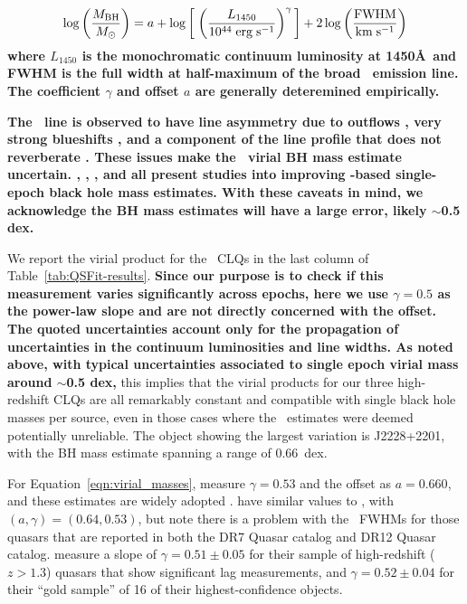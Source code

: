 \documentclass[fleqn,usenatbib]{mnras}
\begin{document}
{\bf
\begin{equation}
  \log \left( \frac{M_{\rm BH}}{M_{\odot}} \right)  = a + \log  \left[ \; \left(  \frac{L_{1450}} {10^{44} \; {\rm erg \; s^{-1}}}\right)^{\gamma} \, \right] + 2 \log \left( \frac{\rm {FWHM}}{{\rm km\; s^{-1}}} \right)
  \label{eqn:virial_masses}
\end{equation}
where $L_{1450}$ is the monochromatic continuum luminosity at
1450\AA\, and FWHM is the full width at half-maximum of the broad
\civ\ emission line.  The coefficient $\gamma$ and offset $a$ are
generally deteremined empirically.

 {\bf The \civ\ line is observed to have line asymmetry due to
outflows \citep[e.g.,][]{Gaskell1982}, very strong blueshifts
\citep[as mentioned in the Introduction; see][]{Richards2011}, and a
component of the line profile that does not reverberate
\citep[][]{Denney2012}.  These issues make the \civ\ virial BH mass
estimate uncertain. \citet{Runnoe2013}, \citet{Mejia-Restrepo2016},
\citet{Coatman2017}, \citet{Mejia-Restrepo2018} and \citet{Grier2019}
all present studies into improving \civ-based single-epoch black hole
mass estimates. With these caveats in mind, we acknowledge the BH mass
estimates will have a large error, likely $\sim$0.5 dex. }

We report the virial product for the \civ\ CLQs in the last column of
Table~\ref{tab:QSFit-results}.  {\bf Since our purpose is to check if
this measurement varies significantly across epochs, here we use
$\gamma=0.5$ as the power-law slope and are not directly concerned
with the offset.  The quoted uncertainties account only for the
propagation of uncertainties in the continuum luminosities and line
widths.  As noted above, with typical uncertainties associated to
single epoch virial mass around $\sim$0.5 dex,} this implies that the
virial products for our three high-redshift CLQs are all remarkably
constant and compatible with single black hole masses per source, even
in those cases where the \civ\ estimates were deemed potentially
unreliable. The object showing the largest variation is J2228+2201,
with the BH mass estimate spanning a range of 0.66~dex.

For Equation~\ref{eqn:virial_masses}, \citet{VestergaardPeterson2006}
measure $\gamma=0.53$ and the offset as $a=0.660$, and these estimates
are widely adopted \citep[e.g.,][]{Shen2011, Chen2019, Yao2019}.
\citet{Kozlowski2017} have similar values to 
\citet{VestergaardPeterson2006} , with $(a,\gamma)=(0.64, 0.53)$, but
note there is a problem with the \civ\ FWHMs for those quasars
that are reported in both the DR7 Quasar catalog and DR12 Quasar
catalog.  \citet{Grier2019} measure a slope of $\gamma=0.51\pm0.05$
for their sample of high-redshift ($z>1.3$) quasars that show
significant lag measurements, and $\gamma=0.52\pm0.04$ for their
``gold sample'' of 16 of their highest-confidence objects. }
\end{document}

